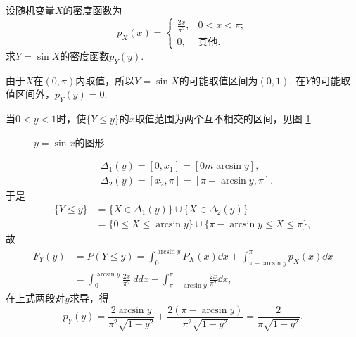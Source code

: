 \begin{example}
  设随机变量$X$的密度函数为
  \[
    p_X(x) = \begin{cases}
      \frac{2x}{\pi^2}, & 0<x<\pi; \\
      0, & \text{其他}.
    \end{cases}
  \]
  求$Y=\sin X$的密度函数$p_Y(y)$.
\end{example}
\begin{solution}
  由于$X$在$(0,\pi)$内取值，所以$Y=\sin X$的可能取值区间为$(0,1)$. 在$Y$的可能取值区间外，$p_Y(y)=0$.

  当$0<y<1$时，使$\{Y\le y\}$的$x$取值范围为两个互不相交的区间，见图 \ref{fig2.6.1}.
  \begin{figure}
  \centering
{}
  \caption{$y=\sin x$的图形}\label{fig2.6.1}
\end{figure}

\begin{align*}
  & \Delta_1(y) = [0,x_1] = [0m\arcsin y], \\
  & \Delta_2(y) = [x_2,\pi] = [\pi-\arcsin y,\pi].
\end{align*}
于是
\begin{align*}
  \{Y\le y\} & = \{ X\in \Delta_1(y) \} \cup \{ X\in\Delta_2(y) \} \\
  & = \{ 0\le X\le \arcsin y \} \cup \{ \pi-\arcsin y \le X \le \pi \},
\end{align*}
故
\begin{align*}
  F_Y(y) & = P(Y\le y) = \int_0^{\arcsin y}P_X(x)\dd x + \int_{\pi-\arcsin y}^\pi p_X(x) \dd x \\
  & = \int_0^{\arcsin y}\frac{2x}{\pi^2}\ dd x + \int_{\pi-\arcsin y}^\pi\frac{2x}{\pi^2}\dd x,
\end{align*}
在上式两段对$y$求导，得
\[
  p_Y(y) = \frac{2\arcsin y}{\pi^2\sqrt{1-y^2}} +
  \frac{2(\pi-\arcsin y)}{\pi^2\sqrt{1-y^2}} =
  \frac2{\pi\sqrt{1-y^2}}.
\]
\end{solution}

